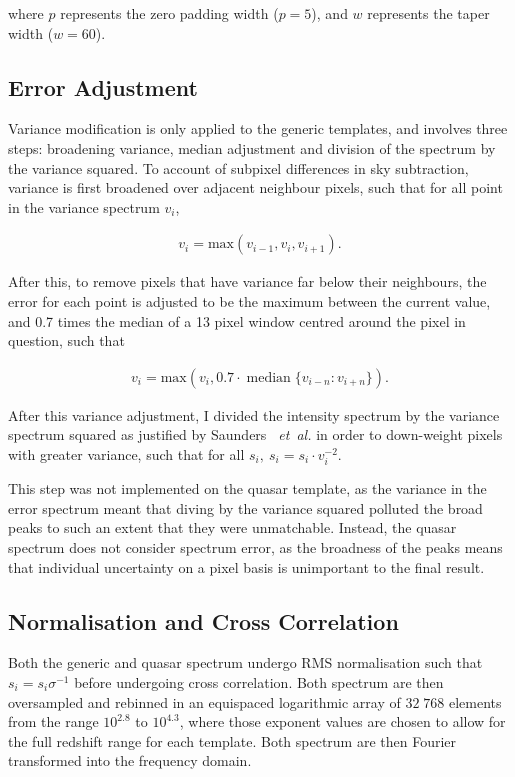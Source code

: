 \documentclass[titlesmallcaps, examinerscopy, copyrightpage]{uqthesis}
\newcommand{\brac}[1]{\left( #1 \right)}
\newcommand {\etal} {\emph{~et~al.} }
\DeclareMathOperator*{\median}{median}
\begin{document}
where $p$ represents the zero padding width ($p=5$), and $w$ represents the taper width ($w=60$).

\subsection{Error Adjustment}

Variance modification is only applied to the generic templates, and involves three steps: broadening variance, median adjustment and division of the spectrum by the variance squared. To account of subpixel differences in sky subtraction, variance is first broadened over adjacent neighbour pixels, such that for all point in the variance spectrum $v_i$, 

\begin{align}
v_i = \mathrm{max}(v_{i-1}, v_i, v_{i+1}).
\end{align}

After this, to remove pixels that have variance far below their neighbours, the error for each point is adjusted to be the maximum between the current value, and 0.7 times the median of a 13 pixel window centred around the pixel in question, such that

\begin{align}
v_i = \mathrm{max}\brac{v_i, 0.7\cdot \median\{v_{i-n}:v_{i+n}\}}.
\end{align}

After this variance adjustment, I divided the intensity spectrum by the variance spectrum squared as justified by Saunders \etal \cite{saunders2004improvements} in order to down-weight pixels with greater variance, such that for all $s_i,\ s_i = s_i \cdot v_i^{-2}$.

This step was not implemented on the quasar template, as the variance in the error spectrum meant that diving by the variance squared polluted the broad peaks to such an extent that they were unmatchable. Instead, the quasar spectrum does not consider spectrum error, as the broadness of the peaks means that individual uncertainty on a pixel basis is unimportant to the final result.

\subsection{Normalisation and Cross Correlation} \label{sec:transform}

Both the generic and quasar spectrum undergo RMS normalisation such that $s_i = s_i \sigma^{-1}$ before undergoing cross correlation. Both spectrum are then oversampled and rebinned in an equispaced logarithmic array of $32\;768$ elements from the range $10^{2.8}$ to $10^{4.3}$, where those exponent values are chosen to allow for the full redshift range for each template. Both spectrum are then Fourier transformed into the frequency domain.
\end{document}
